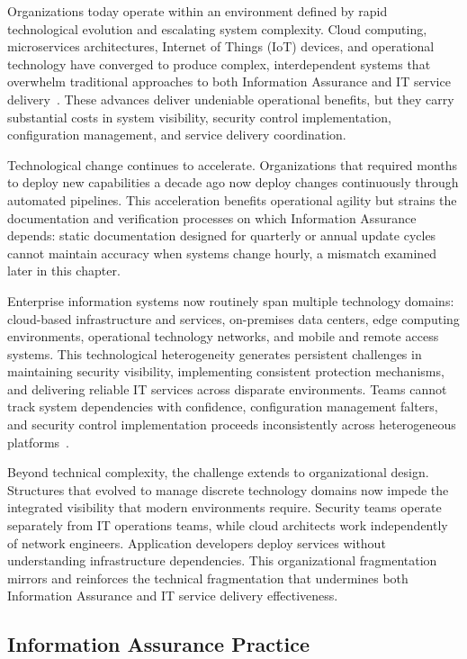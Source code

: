 Organizations today operate within an environment defined by rapid technological evolution and escalating system complexity. Cloud computing, microservices architectures, Internet of Things (IoT) devices, and operational technology have converged to produce complex, interdependent systems that overwhelm traditional approaches to both Information Assurance and IT service delivery~\parencite{Benbya_Nan_Tanriverdi_Yoo_2020}. These advances deliver undeniable operational benefits, but they carry substantial costs in system visibility, security control implementation, configuration management, and service delivery coordination.

Technological change continues to accelerate. Organizations that required months to deploy new capabilities a decade ago now deploy changes continuously through automated pipelines. This acceleration benefits operational agility but strains the documentation and verification processes on which Information Assurance depends: static documentation designed for quarterly or annual update cycles cannot maintain accuracy when systems change hourly, a mismatch examined later in this chapter.

Enterprise information systems now routinely span multiple technology domains: cloud-based infrastructure and services, on-premises data centers, edge computing environments, operational technology networks, and mobile and remote access systems. This technological heterogeneity generates persistent challenges in maintaining security visibility, implementing consistent protection mechanisms, and delivering reliable IT services across disparate environments. Teams cannot track system dependencies with confidence, configuration management falters, and security control implementation proceeds inconsistently across heterogeneous platforms~\parencite{Bokan_Santos_2021}.

Beyond technical complexity, the challenge extends to organizational design. Structures that evolved to manage discrete technology domains now impede the integrated visibility that modern environments require. Security teams operate separately from IT operations teams, while cloud architects work independently of network engineers. Application developers deploy services without understanding infrastructure dependencies. This organizational fragmentation mirrors and reinforces the technical fragmentation that undermines both Information Assurance and IT service delivery effectiveness.

\subsection{Information Assurance Practice}

